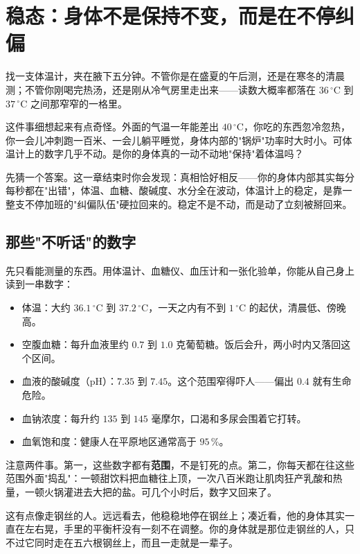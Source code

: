 \chapter{稳态：身体不是保持不变，而是在不停纠偏}

\begin{kaichang}
找一支体温计，夹在腋下五分钟。不管你是在盛夏的午后测，还是在寒冬的清晨测；不管你刚喝完热汤，还是刚从冷气房里走出来——读数大概率都落在 $36\,^{\circ}\mathrm{C}$ 到 $37\,^{\circ}\mathrm{C}$ 之间那窄窄的一格里。

这件事细想起来有点奇怪。外面的气温一年能差出 $40\,^{\circ}\mathrm{C}$，你吃的东西忽冷忽热，你一会儿冲刺跑一百米、一会儿躺平睡觉，身体内部的"锅炉"功率时大时小。可体温计上的数字几乎不动。是你的身体真的一动不动地"保持"着体温吗？

先猜一个答案。这一章结束时你会发现：真相恰好相反——你的身体内部其实每分每秒都在"出错"，体温、血糖、酸碱度、水分全在波动，体温计上的稳定，是靠一整支不停加班的"纠偏队伍"硬拉回来的。稳定不是不动，而是动了立刻被掰回来。
\end{kaichang}

\section{那些"不听话"的数字}

先只看能测量的东西。用体温计、血糖仪、血压计和一张化验单，你能从自己身上读到一串数字：

\begin{itemize}[itemsep=2pt]
\item 体温：大约 $36.1\,^{\circ}\mathrm{C}$ 到 $37.2\,^{\circ}\mathrm{C}$，一天之内有不到 $1\,^{\circ}\mathrm{C}$ 的起伏，清晨低、傍晚高。
\item 空腹血糖：每升血液里约 $0.7$ 到 $1.0$ 克葡萄糖。饭后会升，两小时内又落回这个区间。
\item 血液的酸碱度（pH）：$7.35$ 到 $7.45$。这个范围窄得吓人——偏出 $0.4$ 就有生命危险。
\item 血钠浓度：每升约 $135$ 到 $145$ 毫摩尔，口渴和多尿会围着它打转。
\item 血氧饱和度：健康人在平原地区通常高于 $95\,\%$。
\end{itemize}

注意两件事。第一，这些数字都有\textbf{范围}，不是钉死的点。第二，你每天都在往这些范围外面"捣乱"：一顿甜饮料把血糖往上顶，一次八百米跑让肌肉狂产乳酸和热量，一顿火锅灌进去大把的盐。可几个小时后，数字又回来了。

这有点像走钢丝的人。远远看去，他稳稳地停在钢丝上；凑近看，他的身体其实一直在左右晃，手里的平衡杆没有一刻不在调整。你的身体就是那位走钢丝的人，只不过它同时走在五六根钢丝上，而且一走就是一辈子。

